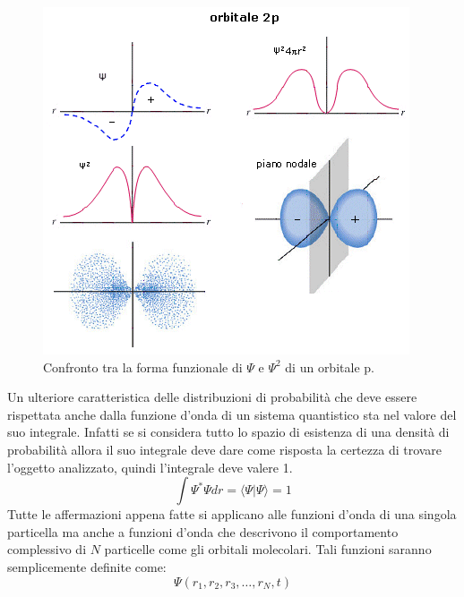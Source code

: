 \documentclass[oneside]{amsbook}
\numberwithin{section}{chapter}
\numberwithin{equation}{section}
\numberwithin{figure}{section}
\begin{document}
\begin{figure}[H]
\centering
\caption{ Confronto tra la forma funzionale di $\Psi$ e $\Psi^2$ di un orbitale p.}\label{distrib}
\includegraphics[scale=0.3]{distrib}
\end{figure}

Un ulteriore caratteristica delle distribuzioni di probabilità che deve essere rispettata anche dalla funzione d'onda di un sistema quantistico sta nel valore del suo integrale. Infatti se si considera tutto lo spazio di esistenza di una densità di probabilità allora il suo integrale deve dare come risposta la certezza di trovare l'oggetto analizzato, quindi l'integrale deve valere 1.
\begin{equation}
\int \Psi^* \Psi dr = \langle\Psi\vert\Psi\rangle=1
\end{equation}
 Tutte le affermazioni appena fatte si applicano alle funzioni d'onda di una singola particella ma anche a funzioni d'onda che descrivono il comportamento complessivo di $N$ particelle come gli orbitali molecolari. Tali funzioni saranno semplicemente definite come:
 \begin{equation}
 \Psi(r_1,r_2,r_3,\ldots,r_N,t)
 \end{equation}
\end{document}
